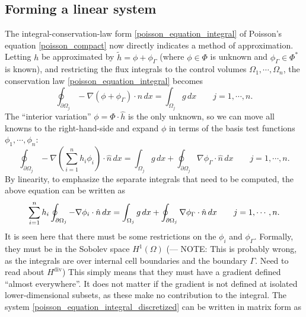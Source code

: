 \subsection{Forming a linear system}
The integral-conservation-law form \eqref{poisson_equation_integral} of Poisson's equation \eqref{poisson_compact}
now directly indicates a method of approximation. Letting $h$ be approximated by $\tilde{h} = \phi + \phi_\Gamma$ (where $\phi \in \Phi$ is unknown and $\phi_\Gamma \in \Phi^*$ is known),
and restricting the flux integrals to the control volumes $\Omega_1,\cdots,\Omega_n$, the conservation law \eqref{poisson_equation_integral} becomes
\begin{equation}\label{poisson_equation_integral_fvm}
    \oint_{\partial\Omega_j} -\nabla \left(\phi + \phi_\Gamma\right) \cdot \hat{n}\,dx = \int_{\Omega_j} g\,dx \quad\quad j=1,\cdots,n.
\end{equation}
The ``interior variation'' $\phi = \Phi\cdot \hat{h}$ is the only unknown, so we can move all knowns to the right-hand-side
and expand $\phi$ in terms of the basis test functions $\phi_1,\cdots,\phi_n$:
\begin{equation}\label{poisson_equation_integral_fvm_knowns_unknowns}
    \oint_{\partial\Omega_j} -\nabla \left(\sum_{i=1}^nh_i\phi_i\right) \cdot \hat{n}\,dx =
            \int_{\Omega_j} g\,dx
            + \oint_{\partial\Omega_j} \nabla \phi_\Gamma \cdot \hat{n}\,dx
 \quad\quad j=1,\cdots,n.
\end{equation}
By linearity, to emphasize the separate integrals that need to be computed, the above equation can be written as
\begin{equation}\label{poisson_equation_integral_discretized}
    \sum_{i=1}^n h_i\oint_{{\partial\Omega}_j} -\nabla \phi_i \cdot \hat{n}\,dx =
            \int_{\Omega_j} g\,dx
            + \oint_{\partial\Omega_j} \nabla \phi_\Gamma \cdot \hat{n}\,dx
 \quad\quad j=1,\cdots,n.
\end{equation}
It is seen here that there must be some restrictions on the $\phi_i$ and $\phi_\Gamma$.
Formally, they must be in the Sobolev space $H^1(\Omega)$
(--- NOTE: This is probably wrong, as the integrals are over internal cell boundaries and the boundary $\Gamma$. Need to read
about $H^{\text{div}}$)
This simply means that they must have a gradient defined ``almost everywhere''.
It does not matter if the gradient is not defined at isolated lower-dimensional subsets, as these make no contribution to
the integral. The system \eqref{poisson_equation_integral_discretized} can be written in matrix form as
